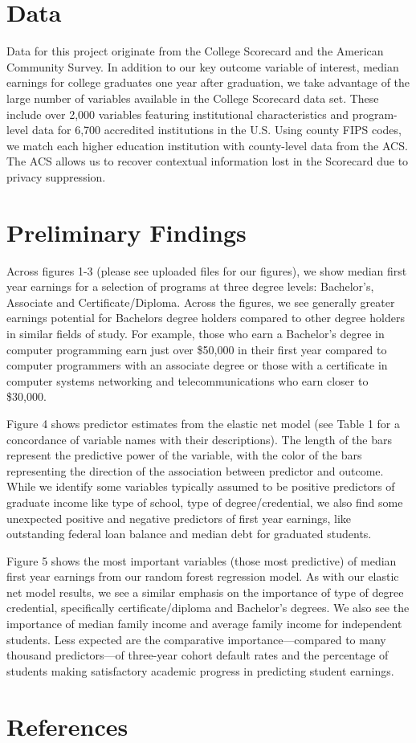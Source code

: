 \hypertarget{data}{%
\section{Data}\label{data}}

Data for this project originate from the College Scorecard and the
American Community Survey. In addition to our key outcome variable of
interest, median earnings for college graduates one year after
graduation, we take advantage of the large number of variables available
in the College Scorecard data set. These include over 2,000 variables
featuring institutional characteristics and program-level data for 6,700
accredited institutions in the U.S. Using county FIPS codes, we match
each higher education institution with county-level data from the ACS.
The ACS allows us to recover contextual information lost in the
Scorecard due to privacy suppression.

\hypertarget{preliminary-findings}{%
\section{Preliminary Findings}\label{preliminary-findings}}

Across figures 1-3 (please see uploaded files for our figures), we show
median first year earnings for a selection of programs at three degree
levels: Bachelor's, Associate and Certificate/Diploma. Across the
figures, we see generally greater earnings potential for Bachelors
degree holders compared to other degree holders in similar fields of
study. For example, those who earn a Bachelor's degree in computer
programming earn just over \$50,000 in their first year compared to
computer programmers with an associate degree or those with a
certificate in computer systems networking and telecommunications who
earn closer to \$30,000.

Figure 4 shows predictor estimates from the elastic net model (see Table
1 for a concordance of variable names with their descriptions). The
length of the bars represent the predictive power of the variable, with
the color of the bars representing the direction of the association
between predictor and outcome. While we identify some variables
typically assumed to be positive predictors of graduate income like type
of school, type of degree/credential, we also find some unexpected
positive and negative predictors of first year earnings, like
outstanding federal loan balance and median debt for graduated students.

Figure 5 shows the most important variables (those most predictive) of
median first year earnings from our random forest regression model. As
with our elastic net model results, we see a similar emphasis on the
importance of type of degree credential, specifically
certificate/diploma and Bachelor's degrees. We also see the importance
of median family income and average family income for independent
students. Less expected are the comparative importance---compared to
many thousand predictors---of three-year cohort default rates and the
percentage of students making satisfactory academic progress in
predicting student earnings.

\hypertarget{references}{%
\section{References}\label{references}}
